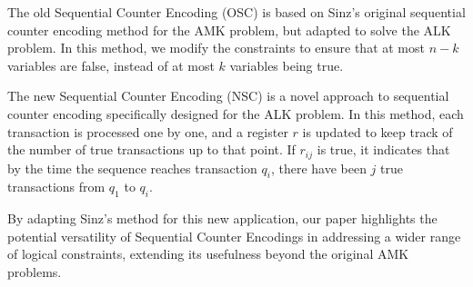 The old Sequential Counter Encoding (OSC) is based on Sinz's original sequential counter encoding method for the AMK problem, but adapted to solve the ALK problem. In this method, we modify the constraints to ensure that at most $n-k$ variables are false, instead of at most $k$ variables being true.

The new Sequential Counter Encoding (NSC) is a novel approach to sequential counter encoding specifically designed for the ALK problem. In this method, each transaction is processed one by one, and a register $r$ is updated to keep track of the number of true transactions up to that point. If $r_{ij}$ is true, it indicates that by the time the sequence reaches transaction $q_i$, there have been $j$ true transactions from $q_1$ to $q_i$.

By adapting Sinz's method for this new application, our paper highlights the potential versatility of Sequential Counter Encodings in addressing a wider range of logical constraints, extending its usefulness beyond the original AMK problems.